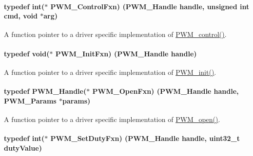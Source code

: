 \paragraph[{P\+W\+M\+\_\+\+Control\+Fxn}]{\setlength{\rightskip}{0pt plus 5cm}typedef int($\ast$ P\+W\+M\+\_\+\+Control\+Fxn) ({\bf P\+W\+M\+\_\+\+Handle} handle, unsigned int cmd, void $\ast$arg)}\label{_p_w_m_8h_af538c912f876c434c62e7e0e28d41b75}


A function pointer to a driver specific implementation of \hyperlink{_p_w_m_8h_ade999f5b12997479efa1ac85aaf46ef5}{P\+W\+M\+\_\+control()}. 

\paragraph[{P\+W\+M\+\_\+\+Init\+Fxn}]{\setlength{\rightskip}{0pt plus 5cm}typedef void($\ast$ P\+W\+M\+\_\+\+Init\+Fxn) ({\bf P\+W\+M\+\_\+\+Handle} handle)}\label{_p_w_m_8h_a38666ae4b117b81d35758258012b251a}


A function pointer to a driver specific implementation of \hyperlink{_p_w_m_8h_aadae3fe77e36cbf9643a22eeb99fb01e}{P\+W\+M\+\_\+init()}. 

\paragraph[{P\+W\+M\+\_\+\+Open\+Fxn}]{\setlength{\rightskip}{0pt plus 5cm}typedef {\bf P\+W\+M\+\_\+\+Handle}($\ast$ P\+W\+M\+\_\+\+Open\+Fxn) ({\bf P\+W\+M\+\_\+\+Handle} handle, {\bf P\+W\+M\+\_\+\+Params} $\ast$params)}\label{_p_w_m_8h_a16b7b446398f8b90e4fa287c6e4a0981}


A function pointer to a driver specific implementation of \hyperlink{_p_w_m_8h_ac963beab0c5c6901bf852f175028aeaf}{P\+W\+M\+\_\+open()}. 

\paragraph[{P\+W\+M\+\_\+\+Set\+Duty\+Fxn}]{\setlength{\rightskip}{0pt plus 5cm}typedef int($\ast$ P\+W\+M\+\_\+\+Set\+Duty\+Fxn) ({\bf P\+W\+M\+\_\+\+Handle} handle, uint32\+\_\+t duty\+Value)}\label{_p_w_m_8h_a052016271d09bd468dddff3168dd46de}


